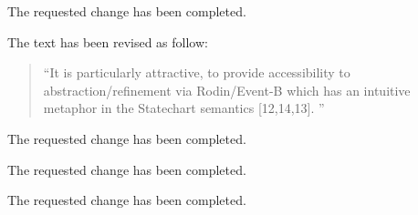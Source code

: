 \documentclass{response}
\begin{document}
\begin{response}
  The requested change has been completed.
\end{response}


\begin{comment}{Reviewer \#2}
- Page 2: line 5: "Particularly attractive is providing" --> "Particularly 
attractive in providing"
\end{comment}

\begin{response}
  The text has been revised as follow:
  \begin{quote}
    ``It is particularly attractive, to provide accessibility to abstraction/refinement via Rodin/Event-B 
    which has an intuitive metaphor in the Statechart semantics [12,14,13]. ''
  \end{quote}
\end{response}


\begin{comment}{Reviewer \#2}
- Page 2: line 10: "safety preservation" --> "safety properties preservation"
\end{comment}

\begin{response}
  The requested change has been completed.
\end{response}


\begin{comment}{Reviewer \#2}
- Page 2: line 20: "Preservation of safety" --> "Preservation of safety 
properties"
\end{comment}

\begin{response}
  The requested change has been completed.
\end{response}


\begin{comment}{Reviewer \#2}
- Page 2: line 45: "in the sense of [9]" --> "in the sense adopted by Lamport [9]"
\end{comment}

\begin{response}
  The requested change has been completed.
\end{response}
\end{document}

